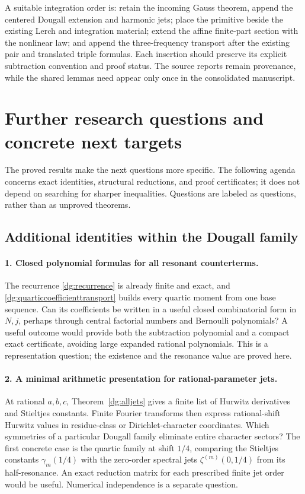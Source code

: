 \documentclass[11pt,a4paper]{article}
\numberwithin{equation}{section}
\theoremstyle{definition}
\theoremstyle{remark}
\begin{document}
A suitable integration order is: retain the incoming Gauss theorem,
append the centered Dougall extension and harmonic jets; place the
primitive beside the existing Lerch and integration material; extend
the affine finite-part section with the nonlinear law; and append the
three-frequency transport after the existing pair and translated
triple formulas. Each insertion should preserve its explicit
subtraction convention and proof status. The source reports remain
provenance, while the shared lemmas need appear only once in the
consolidated manuscript.


\section{Further research questions and concrete next targets}
\label{sec:questions}

The proved results make the next questions more specific. The following
agenda concerns exact identities, structural reductions, and proof
certificates; it does not depend on searching for sharper inequalities.
Questions are labeled as questions, rather than as unproved theorems.

\subsection{Additional identities within the Dougall family}

\paragraph{1. Closed polynomial formulas for all resonant counterterms.}
The recurrence \eqref{dg:recurrence} is already finite and exact, and
\eqref{dg:quarticcoefficienttransport} builds every quartic moment
from one base sequence. Can its coefficients be written in a useful
closed combinatorial form in $N,j$, perhaps through central factorial
numbers and Bernoulli polynomials? A useful outcome would provide both
the subtraction polynomial and a compact exact certificate, avoiding
large expanded rational polynomials. This is a representation question;
the existence and the resonance value are proved here.

\paragraph{2. A minimal arithmetic presentation for rational-parameter jets.}
At rational $a,b,c$, Theorem~\ref{dg:alljets} gives a finite list of
Hurwitz derivatives and Stieltjes constants. Finite Fourier transforms
then express rational-shift Hurwitz values in residue-class or
Dirichlet-character coordinates. Which symmetries of a particular
Dougall family eliminate entire character sectors? The first concrete
case is the quartic family at shift $1/4$, comparing the Stieltjes
constants $\gamma_m(1/4)$ with the zero-order spectral jets
$\zeta^{(m)}(0,1/4)$ from its half-resonance. An exact reduction matrix
for each prescribed finite jet order would be useful. Numerical
independence is a separate question.
\end{document}
